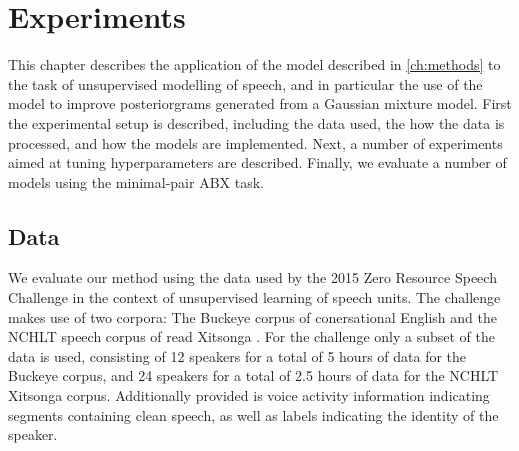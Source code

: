 %
%
%

\chapter{Experiments}
\label{ch:experiments}

This chapter describes the application of the model described in \cref{ch:methods} to the task of unsupervised modelling of speech, and in particular the use of the model to improve posteriorgrams generated from a Gaussian mixture model.
First the experimental setup is described, including the data used, the how the data is processed, and how the models are implemented.
Next, a number of experiments aimed at tuning hyperparameters are described.
Finally, we evaluate a number of models using the minimal-pair ABX task.

\section{Data}
We evaluate our method using the data used by the 2015 Zero Resource Speech Challenge in the context of unsupervised learning of speech units.
The challenge makes use of two corpora: The Buckeye corpus of conersational English \parencite{buckeyecorpus} and the NCHLT speech corpus of read Xitsonga \parencite{barnard2014nchlt}.
For the challenge only a subset of the data is used, consisting of 12 speakers for a total of 5 hours of data for the Buckeye corpus, and 24 speakers for a total of 2.5 hours of data for the NCHLT Xitsonga corpus.
Additionally provided is voice activity information indicating segments containing clean speech, as well as labels indicating the identity of the speaker.

